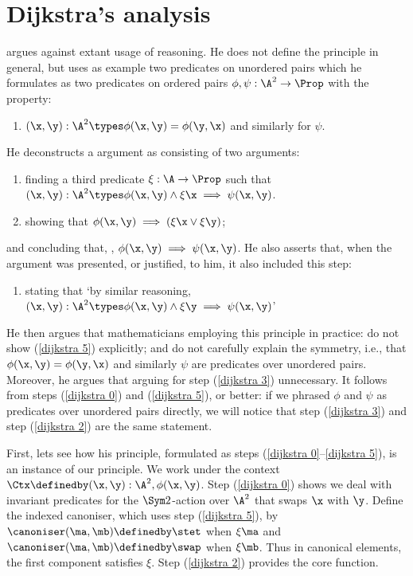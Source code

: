 \section{Dijkstra's analysis}

\citeauthor{dijkstra:wlog} argues against extant usage of \WLOG{}
reasoning.  He does not define the principle in general, but uses as
example two predicates on unordered pairs which he formulates as two
predicates on ordered pairs $\phi,\psi : \A^2 \to \Prop$ with the
property:
\begin{enumerate}
\item\label{dijkstra 0}
  $(\x,\y) : \A^2 \types \phi(\x,\y) = \phi(\y,\x)$ and
  similarly for $\psi$.\\
\end{enumerate}
He deconstructs a \WLOG{} argument
as consisting of two arguments:
\begin{enumerate}[resume]
\item\label{dijkstra 2}
  finding a third predicate $\xi : \A \to \Prop$ such
that $(\x,\y) : \A^2 \types \phi(\x,\y) \land \xi \x \implies \psi(\x,\y)$.
\item\label{dijkstra 5}
  showing that $\phi(\x,\y) \implies (\xi \x \lor \xi \y)$;\\
\end{enumerate}
and concluding that, \WLOG, $\phi(\x,\y) \implies \psi(\x,\y)$.
He also asserts that, when the \WLOG{} argument was presented, or justified,
to him,
it also included this step:
\begin{enumerate}[resume]
\item\label{dijkstra 3}
  stating that `by similar reasoning,
  $(\x,\y) : \A^2 \types \phi(\x,\y) \land \xi \y \implies \psi(\x,\y)$'
\end{enumerate}
He then argues that mathematicians employing this principle in practice:
do not show (\ref{dijkstra 5}) explicitly; and do not
carefully explain the symmetry, i.e., that $\phi(\x,\y) = \phi(\y,\x)$
and similarly $\psi$ are predicates over unordered pairs. Moreover, he
argues that arguing for step (\ref{dijkstra 3}) unnecessary. It follows
from steps (\ref{dijkstra 0}) and (\ref{dijkstra 5}), or
better: if we phrased $\phi$ and $\psi$ as predicates over unordered
pairs directly, we will notice that step (\ref{dijkstra 3})
and step (\ref{dijkstra 2}) are the same statement.

First, lets see how his \WLOG{} principle, formulated as steps
(\ref{dijkstra 0}--\ref{dijkstra 5}), is an instance of our \WLOG{}
principle. We work under the context $\Ctx \definedby (\x,\y) : \A^2,
\phi(\x,\y)$.  Step (\ref{dijkstra 0}) shows we deal with invariant
predicates for the $\Sym 2$-action over $\A^2$ that swaps $\x$ with
$\y$. Define the indexed canoniser, which uses step (\ref{dijkstra
  5}), by $\canoniser(\ma,\mb) \definedby \stet$ when $\xi \ma$ and
$\canoniser(\ma,\mb) \definedby \swap$ when $\xi \mb$. Thus in
canonical elements, the first component satisfies $\xi$.  Step
(\ref{dijkstra 2}) provides the core function.

